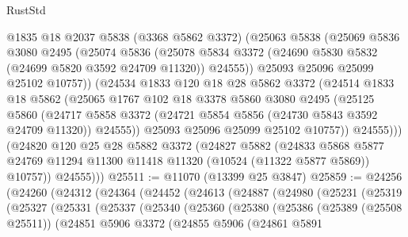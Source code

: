 \begin{lexlean}{RustStd}
\begin{coremodule}
            @1835
            @18
            @2037
            @5838
            (@3368 @5862 @3372)
            (@25063
              @5838
              (@25069
                @5836
                @3080
                @2495
                (@25074
                  @5836
                  (@25078
                    @5834
                    @3372
                    (@24690 @5830 @5832 (@24699 @5820 @3592 @24709 @11320))
                    @24555))
                @25093
                @25096
                @25099
                @25102
                @10757))
            (@24534
              @1833
              @120
              @18
              @28
              @5862
              @3372
              (@24514
                @1833
                @18
                @5862
                (@25065
                  @1767
                  @102
                  @18
                  @3378
                  @5860
                  @3080
                  @2495
                  (@25125
                    @5860
                    (@24717
                      @5858
                      @3372
                      (@24721 @5854 @5856 (@24730 @5843 @3592 @24709 @11320))
                      @24555))
                  @25093
                  @25096
                  @25099
                  @25102
                  @10757))
              @24555)))
        (@24820
          @120
          @25
          @28
          @5882
          @3372
          (@24827
            @5882
            (@24833
              @5868
              @5877
              @24769
              @11294
              @11300
              @11418
              @11320
              (@10524 (@11322 @5877 @5869))
              @10757))
          @24555)))
@25511 := @11070 (@13399 @25 @3847)
@25859 := @24256
    (@24260
      (@24312
        (@24364
          (@24452
            (@24613
              (@24887
                (@24980
                  (@25231
                    (@25319
                      (@25327
                        (@25331
                          (@25337
                            (@25340
                              (@25360
                                (@25380
                                  (@25386
                                    (@25389 (@25508 @25511))
                                    (@24851
                                      @5906
                                      @3372
                                      (@24855
                                        @5906
                                        (@24861
                                          @5891

\end{coremodule}
\end{lexlean}
